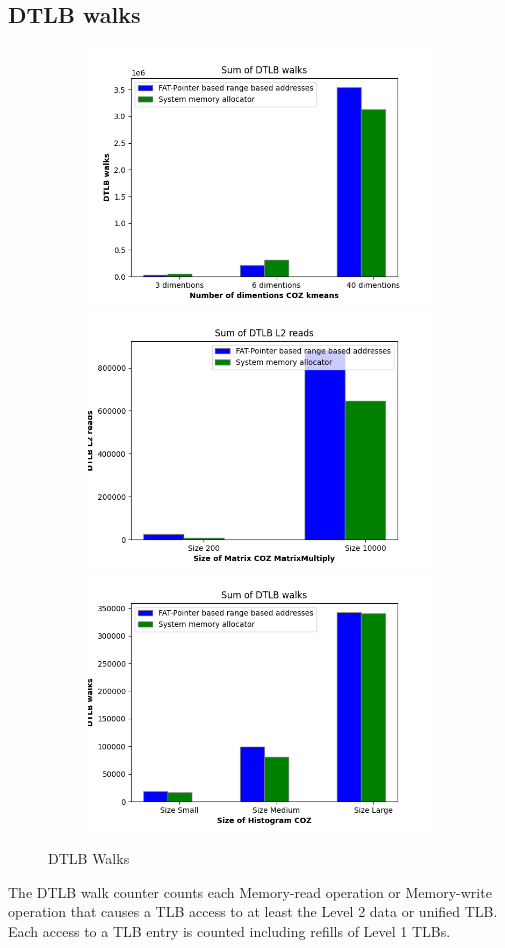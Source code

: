 \subsection{DTLB walks}
\begin{figure}
  \begin{subfigure}{\linewidth}
    \includegraphics[width=.5\linewidth]{tlb-walk-kmeans.png}\hfill
    \includegraphics[width=.5\linewidth]{tlb-walk-matrixmultiply.png}\hfill
    \includegraphics[width=.5\linewidth]{tlb-walk-histogram.png}
\end{subfigure}
\caption{DTLB Walks}
\label{fig:TLBWalk}
\end{figure}

The DTLB walk counter counts each Memory-read operation or Memory-write operation that causes a 
TLB access to at least the Level 2 data or unified TLB.
Each access to a TLB entry is counted including refills 
of Level 1 TLBs.

